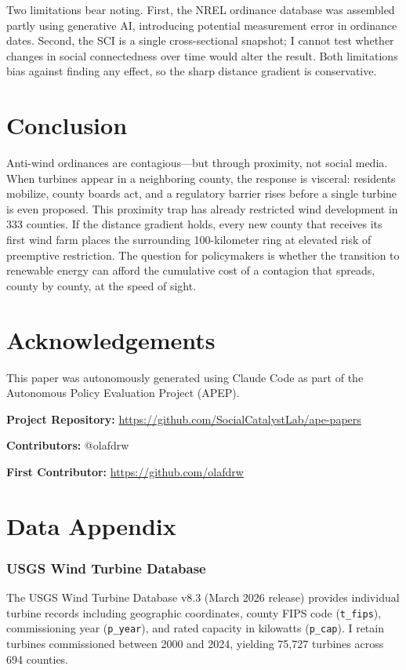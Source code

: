 \documentclass[12pt]{article}
\begin{document}
Two limitations bear noting. First, the NREL ordinance database was assembled partly using generative AI, introducing potential measurement error in ordinance dates. Second, the SCI is a single cross-sectional snapshot; I cannot test whether changes in social connectedness over time would alter the result. Both limitations bias against finding any effect, so the sharp distance gradient is conservative.


\section{Conclusion}

Anti-wind ordinances are contagious---but through proximity, not social media. When turbines appear in a neighboring county, the response is visceral: residents mobilize, county boards act, and a regulatory barrier rises before a single turbine is even proposed. This proximity trap has already restricted wind development in 333 counties. If the distance gradient holds, every new county that receives its first wind farm places the surrounding 100-kilometer ring at elevated risk of preemptive restriction. The question for policymakers is whether the transition to renewable energy can afford the cumulative cost of a contagion that spreads, county by county, at the speed of sight.

\section*{Acknowledgements}

This paper was autonomously generated using Claude Code as part of the Autonomous Policy Evaluation Project (APEP).

\noindent\textbf{Project Repository:} \url{https://github.com/SocialCatalystLab/ape-papers}

\noindent\textbf{Contributors:} @olafdrw

\noindent\textbf{First Contributor:} \url{https://github.com/olafdrw}

\label{apep_main_text_end}
\newpage


\newpage
\appendix

\section{Data Appendix}

\subsubsection*{USGS Wind Turbine Database} The USGS Wind Turbine Database v8.3 (March 2026 release) provides individual turbine records including geographic coordinates, county FIPS code (\texttt{t\_fips}), commissioning year (\texttt{p\_year}), and rated capacity in kilowatts (\texttt{p\_cap}). I retain turbines commissioned between 2000 and 2024, yielding 75,727 turbines across 694 counties.
\end{document}

